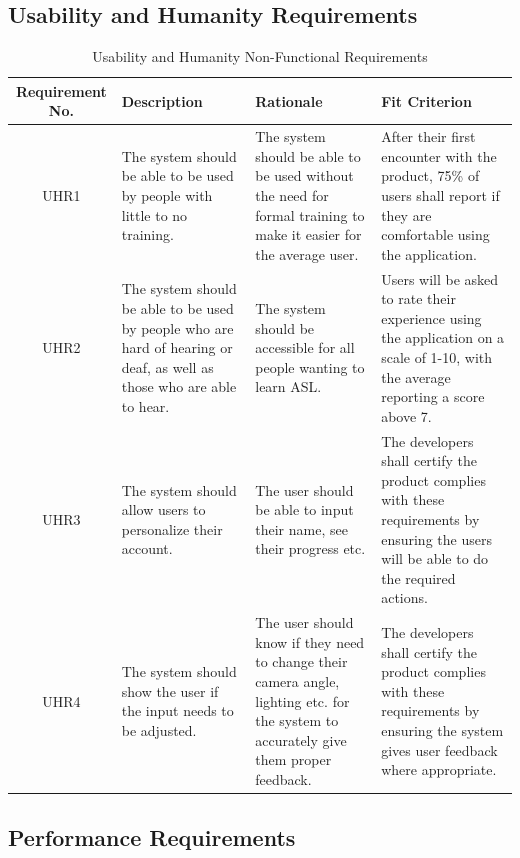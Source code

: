\documentclass[12pt, titlepage]{article}
\begin{document}
\subsection{Usability and Humanity Requirements}

\begin{table}[H]
\caption{Usability and Humanity Non-Functional Requirements}
\noindent \begin{tabular}{| c | p{3cm}| p{3cm}| p{3cm}|}
\hline 
\textbf{Requirement No.} & \textbf{Description} & \textbf{Rationale} & \textbf{Fit Criterion}\\
\hline
UHR1 & The system should be able to be used by people with little to no training. & The system should be able to be used without the need for formal training to make it easier for the average user. & After their first encounter with the product, 75\% of users shall report if they are comfortable using the application.\\
\hline
UHR2 & The system should be able to be used by people who are hard of hearing or deaf, as well as those who are able to hear. & The system should be accessible for all people wanting to learn ASL. & Users will be asked to rate their experience using the application on a scale of 1-10, with the average reporting a score above 7. \\
\hline
UHR3 & The system should allow users to personalize their account. & The user should be able to input their name, see their progress etc. & The developers shall certify the product complies with these requirements by ensuring the users will be able to do the required actions. \\
\hline
UHR4 & The system should show the user if the input needs to be adjusted. & The user should know if they need to change their camera angle, lighting etc. for the system to accurately give them proper feedback. & The developers shall certify the product complies with these requirements by ensuring the system gives user feedback where appropriate.\\
\bottomrule
\end{tabular}
\end{table}

\subsection{Performance Requirements}
\end{document}
